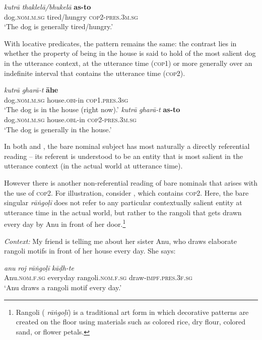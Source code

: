 \documentclass[output=paper,hidelinks]{langscibook}
\begin{document}
\begin{exe}
\begin{xlist}
\ex
\gll \emph{kutrā} \emph{thaklelā/bhukelā} \textbf{as-to}\\
dog.\textsc{nom.m.sg} tired/hungry \textsc{cop2-pres.3m.sg}\\
\glt `The dog is generally tired/hungry.'\label{barenomstageb}
\z
\z
{}

With locative predicates, the pattern remains the same: the contrast lies in whether the property of being in the house is said to hold of the most salient dog in the utterance context, at the utterance time (\textsc{cop1}) or more generally over an indefinite interval that contains the utterance time (\textsc{cop2}).

 \ea \label{barenomloc}
\ea
\gll \emph{kutrā} \emph{gharā-t} \textbf{āhe}\\
dog.\textsc{nom.m.sg} house.\textsc{obi}-in \textsc{cop1.pres.3sg}\\
\glt `The dog is in the house (right now).'\label{barenomloca}
\ex
\gll \emph{kutrā} \emph{gharā-t} \textbf{as-to}\\
dog.\textsc{nom.m.sg} house.\textsc{obl}-in \textsc{cop2-pres.3m.sg}\\
\glt `The dog is generally in the house.' \label{barenomlocb}
\z
\z
{}

In both  and , the bare nominal subject has most naturally a directly referential reading -- its referent is understood to be an entity that is most salient in the utterance context (in the actual world at utterance time).

However there is another non-referential reading of bare nominals that arises with the use of \textsc{cop2}. For illustration, consider , which contains \textsc{cop2}. Here, the bare singular \emph{rā\.{n}goḷī} does not refer to any particular contextually salient entity at utterance time in the actual world, but rather to the rangoli that gets drawn every day by Anu in front of her door.\footnote{Rangoli ( \emph{rā\.{n}goḷī}) is a traditional art form in which decorative patterns are created on the floor using materials such as colored rice, dry flour, colored sand, or flower petals.}

\ea \label{rangoli}
\textit{Context:} My friend is telling me about her sister Anu, who draws elaborate rangoli motifs in front of her house every day. She says:

\ea
\gll \emph{anu} \emph{roj} \emph{rā\.{n}goḷī} \emph{kāḍh-te}\\
Anu.\textsc{nom.f.sg} everyday rangoli.\textsc{nom.f.sg} draw-\textsc{impf.pres.3f.sg}\\
\glt `Anu draws a rangoli motif every day.' \label{rangolia}


\end{xlist}
\end{exe}
\end{document}
